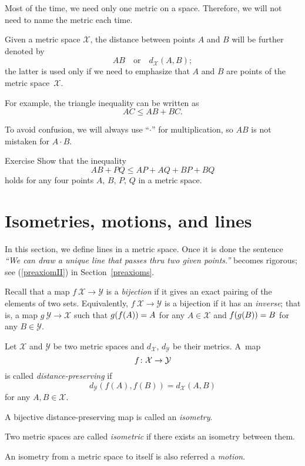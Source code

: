 Most of the time, we need only one metric on a space.
Therefore, we will not need to name the metric each time.

Given a metric space $\mathcal X$,
the distance between points $A$ and $B$ will be further denoted by 
$$AB
\quad
\text{or}
\quad
d_{\mathcal X}(A,B);$$
the latter is used only if we need to emphasize that $A$ and $B$ are points of the metric space~$\mathcal X$.

For example, the triangle inequality can be written as 
$$AC\le AB+BC.$$

To avoid confusion, we will always use ``$\cdot$'' for multiplication,
so $AB$ is not mistaken for $A\cdot B$.

\begin{thm}{Exercise}\label{ex:4-triangle}
Show that the inequality
\[AB+PQ\le AP+AQ+BP+BQ\]
holds for any four points $A$, $B$, $P$, $Q$ in a metric space.
\end{thm}


\section{Isometries, motions, and lines}

In this section, we define lines in a metric space.
Once it is done the sentence \textit{``We can draw a unique line that passes thru two given points.''} becomes rigorous; see (\ref{preaxiomII}) in Section~\ref{preaxioms}. 

Recall that a map $f\:\mathcal{X}\to\mathcal{Y}$
is a \emph{bijection}
if it gives an exact pairing of the elements of two sets.
Equivalently, $f\:\mathcal{X}\to\mathcal{Y}$ is a bijection if it has an \emph{inverse};
that is, a map $g\:\mathcal{Y}\to\mathcal{X}$
such that 
$g(f(A))=A$ for any $A\in\mathcal{X}$
and
$f(g(B))=B$ for any $B\in\mathcal{Y}$. 

Let $\mathcal X$ and $\mathcal Y$ be two metric spaces and $d_{\mathcal X}$, $d_{\mathcal Y}$ be their metrics. 
A~map 
$$f\colon\mathcal X \to \mathcal Y$$ 
is
called \emph{distance-preserving} if 
$$d_{\mathcal Y}(f(A), f(B))
 = d_{\mathcal X}(A,B)$$
for any $A,B\in {\mathcal X}$.

A bijective distance-preserving map is called an \emph{isometry}. 

Two metric spaces are called \emph{isometric} if there exists an isometry between them.

An isometry from a metric space to itself is also referred a \emph{motion}.

